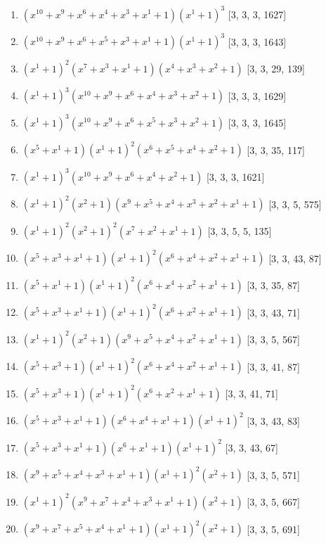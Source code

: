 \documentclass[10pt,twocolumn]{article}
\begin{document}
\begin{enumerate}
\item $(x^{10} + x^{9} + x^{6} + x^{4} + x^{3} + x^{1} + 1)(x^{1} + 1)^{3}$  [3, 3, 3, 1627]
\item $(x^{10} + x^{9} + x^{6} + x^{5} + x^{3} + x^{1} + 1)(x^{1} + 1)^{3}$  [3, 3, 3, 1643]
\item $(x^{1} + 1)^{2}(x^{7} + x^{3} + x^{1} + 1)(x^{4} + x^{3} + x^{2} + 1)$  [3, 3, 29, 139]
\item $(x^{1} + 1)^{3}(x^{10} + x^{9} + x^{6} + x^{4} + x^{3} + x^{2} + 1)$  [3, 3, 3, 1629]
\item $(x^{1} + 1)^{3}(x^{10} + x^{9} + x^{6} + x^{5} + x^{3} + x^{2} + 1)$  [3, 3, 3, 1645]
\item $(x^{5} + x^{1} + 1)(x^{1} + 1)^{2}(x^{6} + x^{5} + x^{4} + x^{2} + 1)$  [3, 3, 35, 117]
\item $(x^{1} + 1)^{3}(x^{10} + x^{9} + x^{6} + x^{4} + x^{2} + 1)$  [3, 3, 3, 1621]
\item $(x^{1} + 1)^{2}(x^{2} + 1)(x^{9} + x^{5} + x^{4} + x^{3} + x^{2} + x^{1} + 1)$  [3, 3, 5, 575]
\item $(x^{1} + 1)^{2}(x^{2} + 1)^{2}(x^{7} + x^{2} + x^{1} + 1)$  [3, 3, 5, 5, 135]
\item $(x^{5} + x^{3} + x^{1} + 1)(x^{1} + 1)^{2}(x^{6} + x^{4} + x^{2} + x^{1} + 1)$  [3, 3, 43, 87]
\item $(x^{5} + x^{1} + 1)(x^{1} + 1)^{2}(x^{6} + x^{4} + x^{2} + x^{1} + 1)$  [3, 3, 35, 87]
\item $(x^{5} + x^{3} + x^{1} + 1)(x^{1} + 1)^{2}(x^{6} + x^{2} + x^{1} + 1)$  [3, 3, 43, 71]
\item $(x^{1} + 1)^{2}(x^{2} + 1)(x^{9} + x^{5} + x^{4} + x^{2} + x^{1} + 1)$  [3, 3, 5, 567]
\item $(x^{5} + x^{3} + 1)(x^{1} + 1)^{2}(x^{6} + x^{4} + x^{2} + x^{1} + 1)$  [3, 3, 41, 87]
\item $(x^{5} + x^{3} + 1)(x^{1} + 1)^{2}(x^{6} + x^{2} + x^{1} + 1)$  [3, 3, 41, 71]
\item $(x^{5} + x^{3} + x^{1} + 1)(x^{6} + x^{4} + x^{1} + 1)(x^{1} + 1)^{2}$  [3, 3, 43, 83]
\item $(x^{5} + x^{3} + x^{1} + 1)(x^{6} + x^{1} + 1)(x^{1} + 1)^{2}$  [3, 3, 43, 67]
\item $(x^{9} + x^{5} + x^{4} + x^{3} + x^{1} + 1)(x^{1} + 1)^{2}(x^{2} + 1)$  [3, 3, 5, 571]
\item $(x^{1} + 1)^{2}(x^{9} + x^{7} + x^{4} + x^{3} + x^{1} + 1)(x^{2} + 1)$  [3, 3, 5, 667]
\item $(x^{9} + x^{7} + x^{5} + x^{4} + x^{1} + 1)(x^{1} + 1)^{2}(x^{2} + 1)$  [3, 3, 5, 691]

\end{enumerate}
\end{document}
